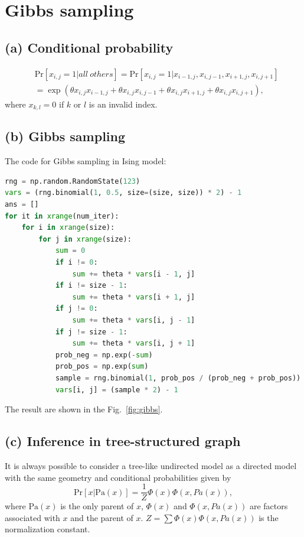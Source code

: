 \documentclass[a4paper]{article}
\begin{document}
\section{Gibbs sampling}
\subsection{(a) Conditional probability}

\begin{align*}
& \mathrm{Pr}\left[x_{i, j} = 1 | all\ others\right] 
= \mathrm{Pr}\left[x_{i, j} = 1| x_{i - 1, j}, x_{i, j - 1}, x_{i + 1, j}, x_{i, j + 1}\right] \\
&= \exp(\theta x_{i, j} x_{i - 1, j} + \theta x_{i, j} x_{i, j - 1} + \theta x_{i, j} x_{i + 1, j} + \theta x_{i, j} x_{i, j + 1}),
\end{align*}
where $x_{k, l} = 0$ if $k$ or $l$ is an invalid index.


\subsection{(b) Gibbs sampling}
The code for Gibbs sampling in Ising model:
\begin{lstlisting}[language=Python]
rng = np.random.RandomState(123)
vars = (rng.binomial(1, 0.5, size=(size, size)) * 2) - 1
ans = []
for it in xrange(num_iter):
    for i in xrange(size):
        for j in xrange(size):
            sum = 0
            if i != 0:
                sum += theta * vars[i - 1, j]
            if i != size - 1:
                sum += theta * vars[i + 1, j]
            if j != 0:
                sum += theta * vars[i, j - 1]
            if j != size - 1:
                sum += theta * vars[i, j + 1]
            prob_neg = np.exp(-sum)
            prob_pos = np.exp(sum)
            sample = rng.binomial(1, prob_pos / (prob_neg + prob_pos))
            vars[i, j] = (sample * 2) - 1
\end{lstlisting}
The result are shown in the Fig.~\ref{fig:gibbs}.

\subsection{(c) Inference in tree-structured graph}

It is always possible to consider a tree-like undirected model as a directed model with the 
same geometry and conditional probabilities given by 
\begin{equation}
\mathrm{Pr}\left[ x | \mathrm{Pa}(x)\right] = \frac{1}{Z} \Phi(x) \Phi(x, Pa(x)),
\label{eq:fact}
\end{equation}
where $\mathrm{Pa}(x)$ is the only parent of $x$, $\Phi(x)$ and $\Phi(x, Pa(x))$ are factors 
associated with $x$ and the parent of $x$. $Z = \sum \Phi(x) \Phi(x, Pa(x))$ is the normalization constant.
\end{document}

